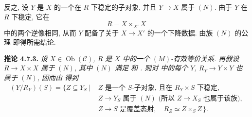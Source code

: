 反之, 设 \(Y\) 是 \(X\) 的一个在 \(R\) 下稳定的子对象,
并且 \(Y\to X\) 属于 \((N)\).
由于 \(Y\) 在 \(R\) 下稳定,
它在
\[
  R=X\times_{X'}X
\]
中的两个逆像相同, 从而 \(Y\) 配备了关于 \(X\to X'\) 的一个下降数据.
由族 \((N)\) 的公理
 即得所需结论.

\medskip
\noindent{}\textbf{推论 4.7.3.}
\textit{设 \(X\in\operatorname{Ob}(\mathscr C)\),
\(R\) 是 \(X\) 中的一个 \((M)\)-有效等价关系.
再假设 \(R\to X\times X\) 属于 \((N)\),
其中 \((N)\) 满足  和
.
则对  中的每个 \(Y\),
\(R_Y\to Y\times Y\) 也属于 \((N)\),
因而由  得到}
\[
\begin{aligned}
 (Y/R_Y)(S)=\{Z\subseteq Y_S\mid{}&
   Z\text{ 是一个 }S\text{-子对象, 且在 }R_Y\times S\text{ 下稳定},\\
 & Z\to Y_S\text{ 属于 }(N)
   \text{ (所以 }Z\to X_S\text{ 也属于该族}),\\
 & Z\to S\text{ 是覆盖态射},\quad R_Z\simeq Z\times_S Z\,\}.
\end{aligned}
\]

